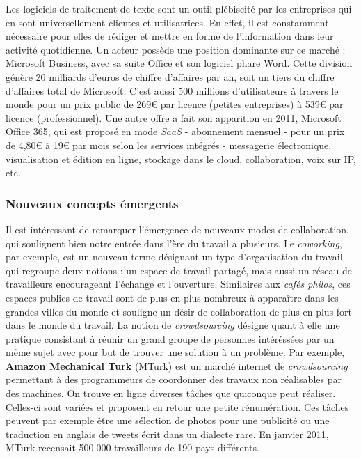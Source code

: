 \documentclass[10pt,twocolumn,a4paper,utf8x]{article}
\begin{document}
Les logiciels de traitement de texte sont un outil plébiscité par les
entreprises qui en sont universellement clientes et utilisatrices. En
effet, il est constamment nécessaire pour elles de rédiger et mettre en
forme de l'information dans leur activité quotidienne. Un acteur possède
une position dominante sur ce marché : Microsoft Business, avec sa suite
Office et son logiciel phare Word. Cette division génère 20 milliards
d'euros de chiffre d'affaires par an, soit un tiers du chiffre
d'affaires total de Microsoft. C'est aussi 500 millions d'utilisateurs à
travers le monde pour un prix public de 269\euro{} par licence (petites
entreprises) à 539\euro{} par licence (professionnel). Une autre offre a
fait son apparition en 2011, Microsoft Office 365, qui est proposé en
mode \emph{SaaS} - abonnement mensuel - pour un prix de 4,80\euro{} à
19\euro{} par mois selon les services intégrés - messagerie
électronique, visualisation et édition en ligne, stockage dans le cloud,
collaboration, voix sur IP, etc.

\subsubsection{Nouveaux concepts émergents}

Il est intéressant de remarquer l'émergence de nouveaux modes de
collaboration, qui soulignent bien notre entrée dans l'ère du travail a
plusieurs. Le \emph{coworking}, par exemple, est un nouveau terme
désignant un type d'organisation du travail qui regroupe deux notions :
un espace de travail partagé, mais aussi un réseau de travailleurs
encourageant l'échange et l'ouverture. Similaires aux \emph{cafés
philos}, ces espaces publics de travail sont de plus en plus nombreux à
apparaître dans les grandes villes du monde et souligne un désir de
collaboration de plus en plus fort dans le monde du travail. La notion
de \emph{crowdsourcing} désigne quant à elle une pratique consistant à
réunir un grand groupe de personnes intéréssées par un même sujet avec
pour but de trouver une solution à un problème. Par exemple,
\textbf{Amazon Mechanical Turk} (MTurk) est un marché internet de
\emph{crowdsourcing} permettant à des programmeurs de coordonner des
travaux non réalisables par des machines. On trouve en ligne diverses
tâches que quiconque peut réaliser. Celles-ci sont variées et proposent
en retour une petite rénumération. Ces tâches peuvent par exemple être
une sélection de photos pour une publicité ou une traduction en anglais
de tweets écrit dans un dialecte rare. En janvier 2011, MTurk recensait
500.000 travailleurs de 190 pays différents.
\end{document}

